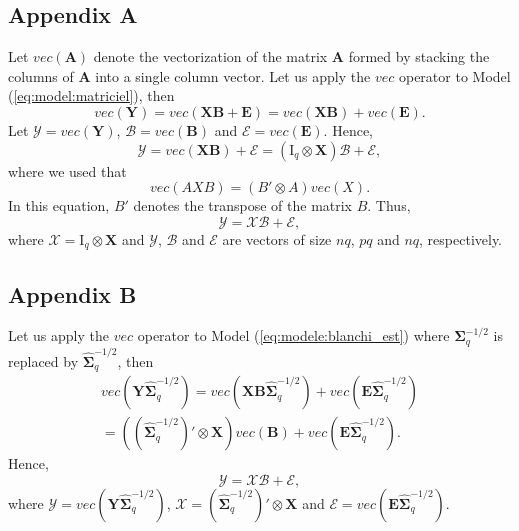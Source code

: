 
\subsection*{Appendix A}

Let $vec(\boldsymbol{A})$ denote the vectorization of the matrix $\boldsymbol{A}$ formed by stacking the columns of 
$\boldsymbol{A}$ into a single column vector. Let us apply the $vec$ operator to Model (\ref{eq:model:matriciel}), then
$$
vec(\boldsymbol{Y})=vec(\boldsymbol{X}\boldsymbol{B}+\boldsymbol{E})=vec(\boldsymbol{X}\boldsymbol{B})+vec(\boldsymbol{E}).
$$
Let $\mathcal{Y}=vec(\boldsymbol{Y})$,  $\mathcal{B}=vec(\boldsymbol{B})$ and $\mathcal{E}=vec(\boldsymbol{E})$.
Hence,
$$
\mathcal{Y}=vec(\boldsymbol{X}\boldsymbol{B})+\mathcal{E}=(\textrm{I}_q\otimes\boldsymbol{X})\mathcal{B}+\mathcal{E},
$$
where we used that \cite[Appendix A.2.5]{mardia:kent:1979}
$$
vec(AXB) = (B'\otimes A) vec(X).
$$
In this equation, $B'$ denotes the transpose of the matrix $B$.
Thus,
$$
\mathcal{Y}=\mathcal{X}\mathcal{B}+\mathcal{E},
$$
where $\mathcal{X}=\textrm{I}_q\otimes\boldsymbol{X}$ and $\mathcal{Y}$, $\mathcal{B}$ and $\mathcal{E}$ are vectors of size $nq$, $pq$ and $nq$, respectively.


\subsection*{Appendix B}

Let us apply the $vec$ operator to Model (\ref{eq:modele:blanchi_est})
where $\boldsymbol{\Sigma}_q^{-1/2}$ is
replaced by $\widehat{\boldsymbol{\Sigma}}_q^{-1/2}$, then
\begin{multline*}
vec(\boldsymbol{Y}\widehat{\boldsymbol{\Sigma}}_q^{-1/2})
=vec(\boldsymbol{X}\boldsymbol{B}\widehat{\boldsymbol{\Sigma}}_q^{-1/2})
+vec(\boldsymbol{E}\widehat{\boldsymbol{\Sigma}}_q^{-1/2})\\
=((\widehat{\boldsymbol{\Sigma}}_q^{-1/2})'\otimes \boldsymbol{X})vec(\boldsymbol{B})
+vec(\boldsymbol{E}\widehat{\boldsymbol{\Sigma}}_q^{-1/2}).
\end{multline*}
Hence,
$$
{\mathcal{Y}}={\mathcal{X}}\mathcal{B}+{\mathcal{E}},
$$
where ${\mathcal{Y}}=vec(\boldsymbol{Y}\widehat{\boldsymbol{\Sigma}}_q^{-1/2})$, 
${\mathcal{X}}=(\widehat{\boldsymbol{\Sigma}}_q^{-1/2})'\otimes \boldsymbol{X}$ 
and ${\mathcal{E}}=vec(\boldsymbol{E}\widehat{\boldsymbol{\Sigma}}_q^{-1/2})$.



